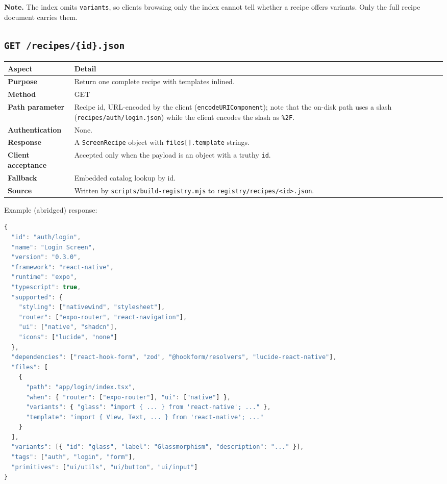 \textbf{Note.} The index omits \texttt{variants}, so clients browsing only the
index cannot tell whether a recipe offers variants. Only the full recipe document
carries them.

\subsection*{\texttt{GET /recipes/\{id\}.json}}

\begin{longtable}{p{3.4cm}p{10.8cm}}
\toprule
\textbf{Aspect} & \textbf{Detail} \\
\midrule
\textbf{Purpose} & Return one complete recipe with templates inlined. \\
\textbf{Method} & GET \\
\textbf{Path parameter} & Recipe id, URL-encoded by the client
(\texttt{encodeURIComponent}); note that the on-disk path uses a slash
(\texttt{recipes/auth/login.json}) while the client encodes the slash as
\texttt{\%2F}. \\
\textbf{Authentication} & None. \\
\textbf{Response} & A \texttt{ScreenRecipe} object with \texttt{files[].template}
strings. \\
\textbf{Client acceptance} & Accepted only when the payload is an object with a
truthy \texttt{id}. \\
\textbf{Fallback} & Embedded catalog lookup by id. \\
\textbf{Source} & Written by \texttt{scripts/build-registry.mjs} to
\texttt{registry/recipes/<id>.json}. \\
\bottomrule
\end{longtable}

Example (abridged) response:

\begin{lstlisting}[language=JavaScript]
{
  "id": "auth/login",
  "name": "Login Screen",
  "version": "0.3.0",
  "framework": "react-native",
  "runtime": "expo",
  "typescript": true,
  "supported": {
    "styling": ["nativewind", "stylesheet"],
    "router": ["expo-router", "react-navigation"],
    "ui": ["native", "shadcn"],
    "icons": ["lucide", "none"]
  },
  "dependencies": ["react-hook-form", "zod", "@hookform/resolvers", "lucide-react-native"],
  "files": [
    {
      "path": "app/login/index.tsx",
      "when": { "router": ["expo-router"], "ui": ["native"] },
      "variants": { "glass": "import { ... } from 'react-native'; ..." },
      "template": "import { View, Text, ... } from 'react-native'; ..."
    }
  ],
  "variants": [{ "id": "glass", "label": "Glassmorphism", "description": "..." }],
  "tags": ["auth", "login", "form"],
  "primitives": ["ui/utils", "ui/button", "ui/input"]
}
\end{lstlisting}

